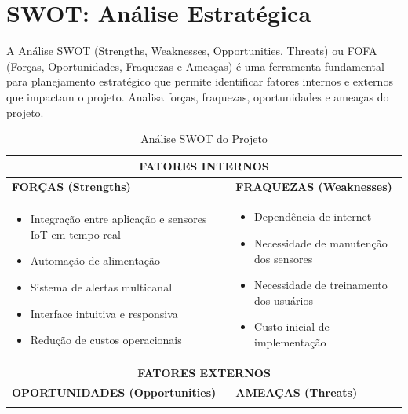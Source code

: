 \documentclass[11pt,a4paper]{article}
\begin{document}
\section{SWOT: Análise Estratégica}

A Análise SWOT (Strengths, Weaknesses, Opportunities, Threats) ou FOFA (Forças, Oportunidades, Fraquezas e Ameaças) \cite{chiavenato2020} é uma ferramenta fundamental para planejamento estratégico que permite identificar fatores internos e externos que impactam o projeto. Analisa forças, fraquezas, oportunidades e ameaças do projeto.

\begin{table}[H]
\centering
\caption{Análise SWOT do Projeto}
\label{tab:swot}
\begin{tabular}{|p{7.2cm}|p{7.2cm}|}
\hline
\multicolumn{2}{|c|}{\cellcolor{secondarycolor!20}\textbf{FATORES INTERNOS}} \\
\hline
\textbf{FORÇAS (Strengths)} & \textbf{FRAQUEZAS (Weaknesses)} \\
\hline
\begin{minipage}[t]{7cm}
\begin{itemize}
    \item Integração entre aplicação e sensores IoT em tempo real
    \item Automação de alimentação
    \item Sistema de alertas multicanal
    \item Interface intuitiva e responsiva
    \item Redução de custos operacionais
\end{itemize}
\end{minipage}
&
\begin{minipage}[t]{7cm}
\begin{itemize}
    \item Dependência de internet
    \item Necessidade de manutenção dos sensores
    \item Necessidade de treinamento dos usuários
    \item Custo inicial de implementação
\end{itemize}
\end{minipage}
\\
\hline
\multicolumn{2}{|c|}{\cellcolor{secondarycolor!20}\textbf{FATORES EXTERNOS}} \\
\hline
\textbf{OPORTUNIDADES (Opportunities)} & \textbf{AMEAÇAS (Threats)} \\
\hline
\begin{minipage}[t]{7cm}

\end{minipage}
\end{tabular}
\end{table}
\end{document}
